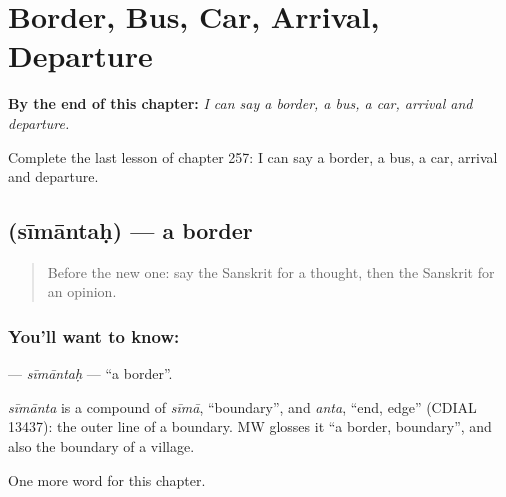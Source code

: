 
\chapter{Border, Bus, Car, Arrival, Departure}
\label{ch:sa-border-bus-car-arrival-departure}

\begin{chapteropening}
\textbf{By the end of this chapter:} \emph{I can say a border, a bus, a car, arrival and departure.}

Complete the last lesson of chapter 257: I can say a border, a bus, a car, arrival and departure.
\end{chapteropening}

\section[\texorpdfstring{\sk{सीमान्तः} (sīmāntaḥ)}{सीमान्तः (sīmāntaḥ)}]{ (sīmāntaḥ) — a border}

\label{lesson:SA-C257-simantah}



\begin{quote}
Before the new one: say the Sanskrit for a thought, then the Sanskrit for an opinion.
\end{quote}

\subsection*{You'll want to know: }
\textbf{} — \emph{sīmāntaḥ} — \textquotedblleft{}a border\textquotedblright{}.

\begin{cousinweb}
\emph{sīmānta} is a compound of \emph{sīmā}, \textquotedblleft{}boundary\textquotedblright{}, and \emph{anta}, \textquotedblleft{}end, edge\textquotedblright{} (CDIAL 13437): the outer line of a boundary. MW glosses it \textquotedblleft{}a border, boundary\textquotedblright{}, and also the boundary of a village.
\end{cousinweb}

\begin{grammarlens}[title={What you've built}]
One more word for this chapter.
\end{grammarlens}

